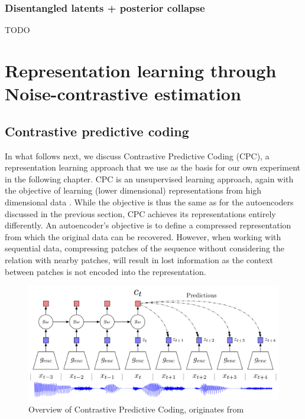 \subsubsection{Disentangled latents + posterior collapse}
	TODO
	\cite{higginsBetaVAELearningBasic2022, burgessUnderstandingDisentanglingBeta2018, lucasUnderstandingPosteriorCollapse2022}


\section{Representation learning through Noise-contrastive estimation}




\subsection{Contrastive predictive coding}


	In what follows next, we discuss Contrastive Predictive Coding (CPC), a representation learning approach that we use as the basis for our own experiment in the following chapter.
	CPC is an unsupervised learning approach, again with the objective of learning (lower dimensional) representations from high dimensional data \cite{oordRepresentationLearningContrastive2019}. While the objective is thus the same as for the autoencoders discussed in the previous section, CPC achieves its representations entirely differently. An autoencoder's objective is to define a compressed representation from which the original data can be recovered. However, when working with sequential data, compressing patches of the sequence without considering the relation with nearby patches, will result in lost information as the context between patches is not encoded into the representation. %


\begin{figure}[h] %
	\centering
	\includegraphics[width=0.7\linewidth]{"cpc overview"}
	\caption{Overview of Contrastive Predictive Coding, originates from \cite{oordRepresentationLearningContrastive2019}}
	\label{fig:cpc-overview}
\end{figure}

